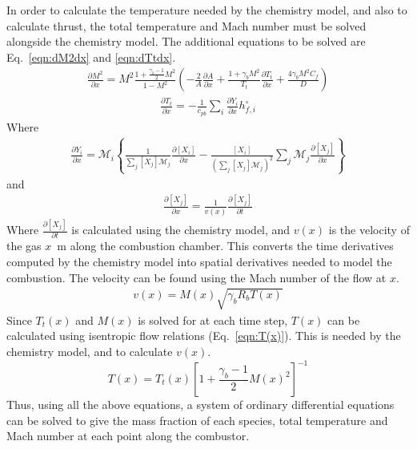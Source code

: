 \documentclass[a4paper]{article}
\begin{document}
In order to calculate the temperature needed by the chemistry model, and also to calculate thrust, the total temperature and Mach number must be solved alongside the chemistry model. The additional equations to be solved are Eq.~\ref{eqn:dM2dx} and \ref{eqn:dTtdx}.
\begin{align}\label{eqn:dM2dx}
    \frac{\partial M^2}{\partial x} =M^2 \frac{1 + \frac{\gamma_b - 1}{2}M^2}{1-M^2}\left( -\frac{2}{A} \frac{\partial A}{\partial x} + \frac{1 + \gamma_b M^2}{T_t}\frac{\partial T_t}{\partial x} + \frac{4 \gamma_b M^2 C_f}{D}\right)
\end{align}
\begin{align}\label{eqn:dTtdx}
    \frac{\partial T_t}{\partial x} = - \frac{1}{c_{pb}}\sum_i \frac{\partial Y_i}{\partial x}h_{f,i}^\circ
\end{align}
Where
\begin{align}\label{eqn:spatial_mass_fraction_gradient}
    \frac{\partial Y_i}{\partial x} = \mathcal{M}_i \left\lbrace \frac{1}{\sum_j \left[X_j\right]\mathcal{M}_j} \frac{\partial \left[X_i\right]}{\partial x} - \frac{\left[ X_i \right]}{\left(\sum_j \left[X_j\right]\mathcal{M}_j \right)^2 }\sum_j \mathcal{M}_j\frac{\partial \left[ X_j \right]}{\partial x} \right\rbrace
\end{align}
and 
\begin{align}\label{eqn:spatial_concentratoin_gradient}
    \frac{\partial \left[X_j\right]}{\partial x} = \frac{1}{v(x)}\frac{\partial \left[X_j\right]}{\partial t}
\end{align}
Where \(\frac{\partial \left[X_j\right]}{\partial t}\) is calculated using the chemistry model, and \(v(x)\) is the velocity of the gas \(x\)~m along the combustion chamber. This converts the time derivatives computed by the chemistry model into spatial derivatives needed to model the combustion. The velocity can be found using the Mach number of the flow at \(x\).
\begin{align}\label{eqn:v(x)}
    v(x) = M(x) \sqrt{\gamma_b R_b T(x)}
\end{align}
Since \(T_t(x)\) and \(M(x)\) is solved for at each time step, \(T(x)\) can be calculated using isentropic flow relations (Eq.~\ref{eqn:T(x)}). This is needed by the chemistry model, and to calculate \(v(x)\).
\begin{equation}\label{eqn:T(x)}
    T(x) = T_t(x) \left[ 1 + \frac{\gamma_b  - 1}{2}M(x)^2 \right]^{-1}
\end{equation}
Thus, using all the above equations, a system of ordinary differential equations can be solved to give the mass fraction of each species, total temperature and Mach number at each point along the combustor.
\end{document}
